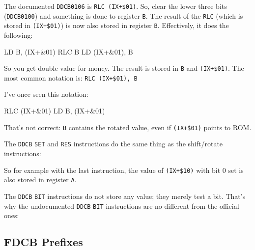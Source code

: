 The documented {\tt DDCB0106} is {\tt RLC (IX+\$01)}. So, clear the lower three bits ({\tt DDCB0100}) and something is done to register {\tt B}. The result of the {\tt RLC} (which is stored in {\tt (IX+\$01)}) is now also stored in register {\tt B}. Effectively, it does the following:

\begin{tcblisting}{}
	LD B, (IX+&01)
	RLC B
	LD (IX+&01), B
\end{tcblisting}

So you get double value for money. The result is stored in {\tt B} and {\tt (IX+\$01)}. The most common notation is: {\tt RLC (IX+\$01), B}

I've once seen this notation:

\begin{tcblisting}{}
	RLC (IX+&01)
	LD B, (IX+&01)
\end{tcblisting}

That's not correct: {\tt B} contains the rotated value, even if {\tt (IX+\$01)} points to ROM.

The {\tt DDCB} {\tt SET} and {\tt RES} instructions do the same thing as the shift/rotate instructions:


So for example with the last instruction, the value of {\tt (IX+\$10)} with bit 0 set is also stored in register {\tt A}.

The {\tt DDCB} {\tt BIT} instructions do not store any value; they merely test a bit. That's why the undocumented {\tt DDCB} {\tt BIT} instructions are no different from the official ones:



\subsection{FDCB Prefixes}

